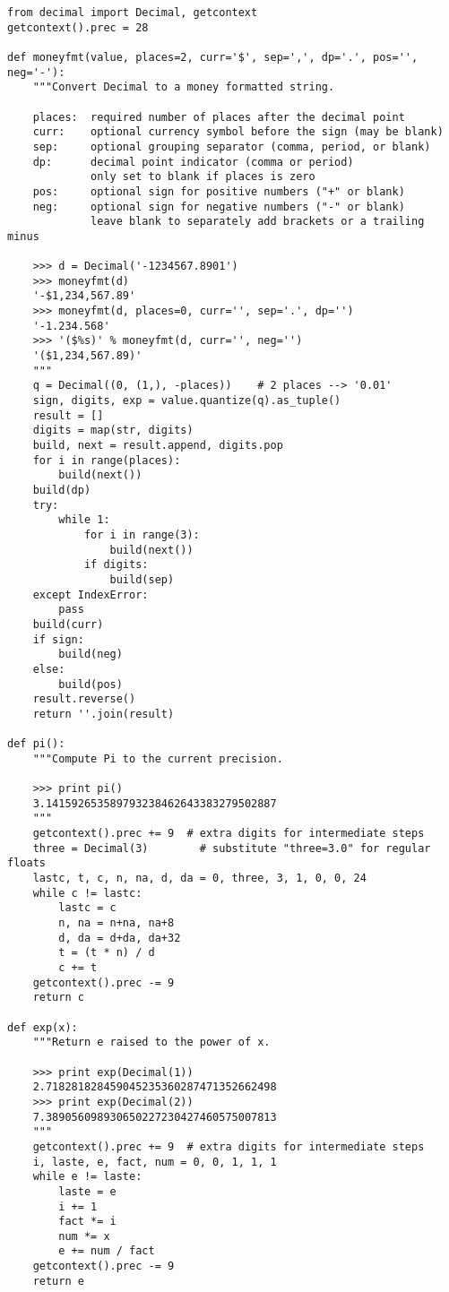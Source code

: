\begin{verbatim}
from decimal import Decimal, getcontext
getcontext().prec = 28

def moneyfmt(value, places=2, curr='$', sep=',', dp='.', pos='', neg='-'):
    """Convert Decimal to a money formatted string.

    places:  required number of places after the decimal point
    curr:    optional currency symbol before the sign (may be blank)
    sep:     optional grouping separator (comma, period, or blank)
    dp:      decimal point indicator (comma or period)
             only set to blank if places is zero
    pos:     optional sign for positive numbers ("+" or blank)
    neg:     optional sign for negative numbers ("-" or blank)
             leave blank to separately add brackets or a trailing minus

    >>> d = Decimal('-1234567.8901')
    >>> moneyfmt(d)
    '-$1,234,567.89'
    >>> moneyfmt(d, places=0, curr='', sep='.', dp='')
    '-1.234.568'
    >>> '($%s)' % moneyfmt(d, curr='', neg='')
    '($1,234,567.89)'
    """
    q = Decimal((0, (1,), -places))    # 2 places --> '0.01'
    sign, digits, exp = value.quantize(q).as_tuple()
    result = []
    digits = map(str, digits)
    build, next = result.append, digits.pop    
    for i in range(places):
        build(next())
    build(dp)
    try:
        while 1:
            for i in range(3):
                build(next())
            if digits:
                build(sep)
    except IndexError:
        pass
    build(curr)
    if sign:
        build(neg)
    else:
        build(pos)
    result.reverse()
    return ''.join(result)

def pi():
    """Compute Pi to the current precision.

    >>> print pi()
    3.141592653589793238462643383279502887
    """
    getcontext().prec += 9  # extra digits for intermediate steps
    three = Decimal(3)        # substitute "three=3.0" for regular floats
    lastc, t, c, n, na, d, da = 0, three, 3, 1, 0, 0, 24
    while c != lastc:
        lastc = c
        n, na = n+na, na+8
        d, da = d+da, da+32
        t = (t * n) / d
        c += t
    getcontext().prec -= 9
    return c

def exp(x):
    """Return e raised to the power of x.

    >>> print exp(Decimal(1))
    2.718281828459045235360287471352662498
    >>> print exp(Decimal(2))
    7.389056098930650227230427460575007813
    """
    getcontext().prec += 9  # extra digits for intermediate steps
    i, laste, e, fact, num = 0, 0, 1, 1, 1
    while e != laste:
        laste = e    
        i += 1
        fact *= i
        num *= x     
        e += num / fact   
    getcontext().prec -= 9        
    return e


\end{verbatim}
